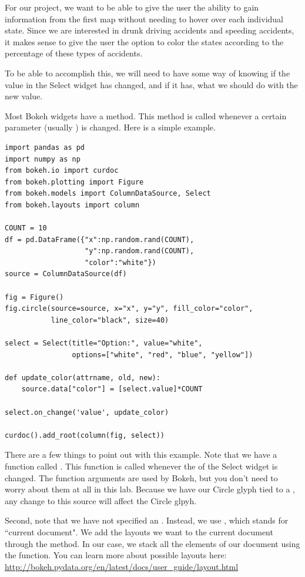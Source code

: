 For our project, we want to be able to
give the user the ability to gain information from the first map without needing
to hover over each individual state. Since we are interested in drunk driving
accidents and speeding accidents, it makes sense to give the user the option to
color the states according to the percentage of these types of accidents.

To be able to accomplish this, we will need to have some way of knowing if the
value in the Select widget has changed, and if it has, what we should do with the
new value.

Most Bokeh widgets have a  method. This method is called whenever
a certain parameter (usually ) is changed. Here is a simple example.

\begin{lstlisting}
import pandas as pd
import numpy as np
from bokeh.io import curdoc
from bokeh.plotting import Figure
from bokeh.models import ColumnDataSource, Select
from bokeh.layouts import column

COUNT = 10
df = pd.DataFrame({"x":np.random.rand(COUNT),
                   "y":np.random.rand(COUNT),
                   "color":"white"})
source = ColumnDataSource(df)

fig = Figure()
fig.circle(source=source, x="x", y="y", fill_color="color",
           line_color="black", size=40)

select = Select(title="Option:", value="white",
                options=["white", "red", "blue", "yellow"])

def update_color(attrname, old, new):
    source.data["color"] = [select.value]*COUNT

select.on_change('value', update_color)

curdoc().add_root(column(fig, select))
\end{lstlisting}

There are a few things to point out with this example. Note that we have a function
called . This function is called whenever the  of
the Select widget is changed. The function arguments 
are used by Bokeh, but you don't need to worry about them at all in this lab.
Because we have our Circle glyph tied to a
, any change to this source will affect the Circle glpyh.

Second, note that we have not specified an . Instead, we use
, which stands for ``current document". We add the layouts we want
to the current document through the  method. In our case, we
stack all the elements of our document using the  function. You can
learn more about possible layouts here:
\url{http://bokeh.pydata.org/en/latest/docs/user_guide/layout.html}

